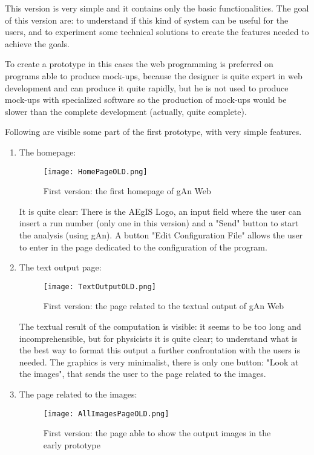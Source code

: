 This version is very simple and it contains only the basic functionalities. 
The goal of this version are: to understand if this kind of system can be useful for the users, and to experiment some technical solutions to create the features needed to achieve the goals. 

To create a prototype in this cases the web programming is preferred on programs able to produce mock-ups, because the designer is quite expert in web development and can produce it quite rapidly, but he is not used to produce mock-ups with specialized software so the production of mock-ups would be slower than the complete development (actually, quite complete). 


Following are visible some part of the first prototype, with very simple features.

\begin{enumerate}
\item The homepage:

\begin{figure}[H]
\centering
\texttt{[image: HomePageOLD.png]} 
\caption{First version: the first homepage of gAn Web}
\end{figure}

It is quite clear: There is the AEgIS Logo, an input field where the user can insert a run number (only one in this version) and a "Send" button to start the analysis (using gAn). A button "Edit Configuration File" allows the user to  enter in the page dedicated to the configuration of the program.

\item The text output page:

\begin{figure}[H]
\centering
\texttt{[image: TextOutputOLD.png]} 
\caption{First version: the page related to the textual output of gAn Web}
\end{figure}
  
The textual result of the computation is visible: it seems to be too long and incomprehensible, but for physicists it is quite clear; to understand what is the best way to format this output a further confrontation with the users is needed. The graphics is very minimalist, there is only one button: "Look at the images", that sends the user to the page related to the images. 



\item The page related to the images:

\begin{figure}[H]
\centering
\texttt{[image: AllImagesPageOLD.png]}
\caption{First version: the page able to show the output images in the early prototype}
\end{figure}   


\end{enumerate}
